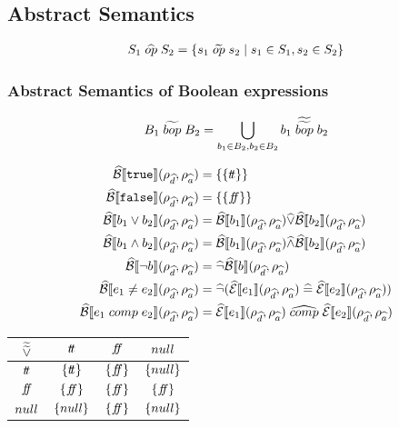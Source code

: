 \subsection{Abstract Semantics}

\begin{align}
    S_1 \;\widehat{op}\; S_2 = \{ s_1 \;\widetilde{op}\; s_2 \mid s_1 \in S_1, s_2 \in S_2 \}
\end{align}

\subsubsection{Abstract Semantics of Boolean expressions}

\begin{align}
    B_1 \;\widetilde{bop}\; B_2 = \bigcup_{b_1 \in B_2, b_2 \in B_2} b_1 \;\widetilde{\widetilde{bop}}\; b_2
\end{align}

\begin{align}
    \widehat{\mathcal{B}}\llbracket \texttt{true} \rrbracket(\rho_{\widehat{d}}, \rho_{\widehat{a}}) &= \{\{t\!t\}\} \\
    \widehat{\mathcal{B}}\llbracket \texttt{false} \rrbracket(\rho_{\widehat{d}}, \rho_{\widehat{a}}) &= \{\{f\!\!f\}\} \\
    \widehat{\mathcal{B}}\llbracket b_1 \lor b_2 \rrbracket(\rho_{\widehat{d}}, \rho_{\widehat{a}}) &= \widehat{\mathcal{B}}\llbracket b_1 \rrbracket(\rho_{\widehat{d}}, \rho_{\widehat{a}}) \widehat{\lor} \widehat{\mathcal{B}}\llbracket b_2 \rrbracket(\rho_{\widehat{d}}, \rho_{\widehat{a}}) \\
    \widehat{\mathcal{B}}\llbracket b_1 \land b_2 \rrbracket(\rho_{\widehat{d}}, \rho_{\widehat{a}}) &= \widehat{\mathcal{B}}\llbracket b_1 \rrbracket(\rho_{\widehat{d}}, \rho_{\widehat{a}}) \widehat{\land} \widehat{\mathcal{B}}\llbracket b_2 \rrbracket(\rho_{\widehat{d}}, \rho_{\widehat{a}}) \\
    \widehat{\mathcal{B}}\llbracket \neg b \rrbracket(\rho_{\widehat{d}}, \rho_{\widehat{a}}) &= \widehat{\neg} \widehat{\mathcal{B}}\llbracket b \rrbracket(\rho_{\widehat{d}}, \rho_{\widehat{a}}) \\
    \widehat{\mathcal{B}}\llbracket e_1 \neq e_2 \rrbracket(\rho_{\widehat{d}}, \rho_{\widehat{a}}) &= \widehat{\neg}(\widehat{\mathcal{E}}\llbracket e_1 \rrbracket(\rho_{\widehat{d}}, \rho_{\widehat{a}}) \;\widehat{=}\; \widehat{\mathcal{E}}\llbracket e_2 \rrbracket(\rho_{\widehat{d}}, \rho_{\widehat{a}})) \\
    \widehat{\mathcal{B}}\llbracket e_1 \;comp\; e_2 \rrbracket(\rho_{\widehat{d}}, \rho_{\widehat{a}}) &= \widehat{\mathcal{E}}\llbracket e_1 \rrbracket(\rho_{\widehat{d}}, \rho_{\widehat{a}}) \;\widehat{comp}\; \widehat{\mathcal{E}}\llbracket e_2 \rrbracket(\rho_{\widehat{d}}, \rho_{\widehat{a}}) \\
\end{align}

\begin{table}[H]
    \centering
    \begin{tabular}{c|ccc}
        $\widetilde{\widetilde{\lor}}$ & $t\!t$ & $f\!\!f$ & $null$ \\
        \hline
        $t\!t$ & $\{t\!t\}$ & $\{f\!\!f\}$ & $\{null\}$ \\
        $f\!\!f$ & $\{f\!\!f\}$ & $\{f\!\!f\}$ & $\{f\!\!f\}$ \\
        $null$ & $\{null\}$ & $\{f\!\!f\}$ & $\{null\}$ \\
    \end{tabular}
    \label{tab:aaablor}
\end{table}

